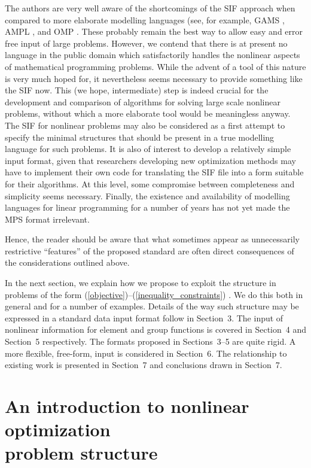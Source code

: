 \documentclass[a4paper]{article}
\newcommand{\req}[1]{(\ref{#1})}
\begin{document}
The   authors are very  well  aware of the  shortcomings  of the  SIF
approach when compared to more elaborate modelling languages
(see, for
example, GAMS \cite{GAMS88},
AMPL \cite{FourGayKern87},
and OMP \cite{OMP87}.
These probably remain the best way to allow easy  and error free input
of large  problems. However, we contend   that there is  at present no
language  in   the public   domain which   satisfactorily handles  the
nonlinear aspects  of mathematical  programming  problems.   While the
advent  of  a  tool of   this   nature  is  very much   hoped  for, it
nevertheless seems necessary  to provide something like  the SIF now.
This  (we  hope,  intermediate)  step  is    indeed crucial  for   the
development   and comparison  of  algorithms for   solving large scale
nonlinear problems,   without  which a  more   elaborate tool would be
meaningless   anyway.  The SIF   for nonlinear problems   may also be
considered as a  first attempt to specify  the minimal structures
that
should be present in a true modelling  language
for such problems. It
is also of interest to develop a relatively simple input format, given
that   researchers  developing new  optimization   methods may have to
implement  their own code  for translating the  SIF file into  a form
suitable for their algorithms.  At this level, some compromise between
completeness and simplicity  seems necessary.  Finally,  the existence
and availability of modelling languages
for linear programming
for  a number of years has not yet made the MPS
format irrelevant.

Hence,  the reader  should   be aware   that what  sometimes appear as
unnecessarily restrictive  ``features'' of  the proposed  standard are
often direct consequences of the considerations outlined above.


In the next section, we explain how we propose to exploit the
structure in problems of the form
\req{objective}--\req{inequality_constraints} . We do this
both in  general and for a number of examples. Details of
the  way such  structure
may be expressed in  a standard data input
format  follow  in Section~3. The  input of nonlinear  information for
element  and group  functions
is  covered  in Section~4 and Section~5
respectively.  The formats proposed  in Sections~3--5 are quite rigid.
A  more flexible,  free-form,
input is considered  in  Section~6.  The relationship to existing work
is presented in Section~7 and conclusions drawn in Section~7.

\section[An introduction to nonlinear optimization
problem structure]{\label{intro_struct}An introduction to nonlinear
optimization  \protect\\ problem structure}
\setcounter{figure}{0}
\end{document}
